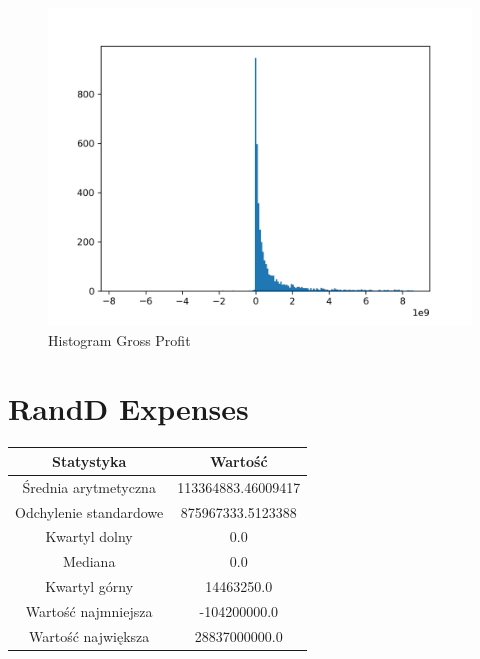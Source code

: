 \documentclass{article}
\begin{document}
\begin{figure}[h!]
    \includegraphics[width=\linewidth]{variables/Gross Profit.png}
    \caption{Histogram Gross Profit }
\end{figure}\section{ RandD Expenses }

\begin{center}
    \begin{tabular}{|c | c|} 
    \hline
    Statystyka & Wartość \\
    \hline\hline
    Średnia arytmetyczna & 113364883.46009417 \\ 
    \hline
    Odchylenie standardowe & 875967333.5123388 \\
    \hline
    Kwartyl dolny & 0.0 \\
    \hline
    Mediana & 0.0 \\
    \hline
    Kwartyl górny & 14463250.0 \\
    \hline
    Wartość najmniejsza & -104200000.0 \\
    \hline
    Wartość największa & 28837000000.0 \\
    \hline
   \end{tabular}
\end{center}
\end{document}
